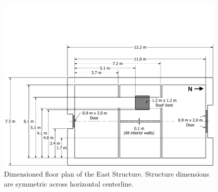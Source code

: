 \documentclass[12pt,oneside]{book}
\begin{document}
\begin{figure}[!ht]
	\includegraphics[width=\columnwidth]{../Figures/Floor_Plans/East_Structure_Dimensioned_Full}
	\caption[Dimensioned floor plan of the East Structure.]{Dimensioned floor plan of the East Structure. Structure dimensions are symmetric across horizontal centerline.}
	\label{fig:east_dimensioned_plan}
\end{figure}
\end{document}
